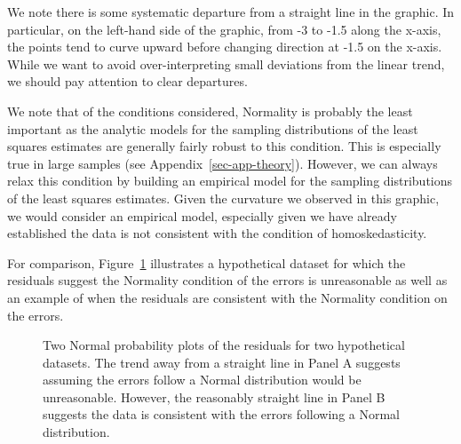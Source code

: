 \documentclass[
  letterpaper,
  DIV=11,
  numbers=noendperiod]{scrreprt}
\theoremstyle{definition}
\theoremstyle{definition}
\theoremstyle{plain}
\theoremstyle{remark}
\begin{document}
We note there is some systematic departure from a straight line in the
graphic. In particular, on the left-hand side of the graphic, from -3 to
-1.5 along the x-axis, the points tend to curve upward before changing
direction at -1.5 on the x-axis. While we want to avoid
over-interpreting small deviations from the linear trend, we should pay
attention to clear departures.

We note that of the conditions considered, Normality is probably the
least important as the analytic models for the sampling distributions of
the least squares estimates are generally fairly robust to this
condition. This is especially true in large samples (see
Appendix~\ref{sec-app-theory}). However, we can always relax this
condition by building an empirical model for the sampling distributions
of the least squares estimates. Given the curvature we observed in this
graphic, we would consider an empirical model, especially given we have
already established the data is not consistent with the condition of
homoskedasticity.

For comparison, Figure~\ref{fig-regassessment-normal-comparison}
illustrates a hypothetical dataset for which the residuals suggest the
Normality condition of the errors is unreasonable as well as an example
of when the residuals are consistent with the Normality condition on the
errors.

\begin{figure}


\caption{\label{fig-regassessment-normal-comparison}Two Normal
probability plots of the residuals for two hypothetical datasets. The
trend away from a straight line in Panel A suggests assuming the errors
follow a Normal distribution would be unreasonable. However, the
reasonably straight line in Panel B suggests the data is consistent with
the errors following a Normal distribution.}

\end{figure}%
\end{document}
